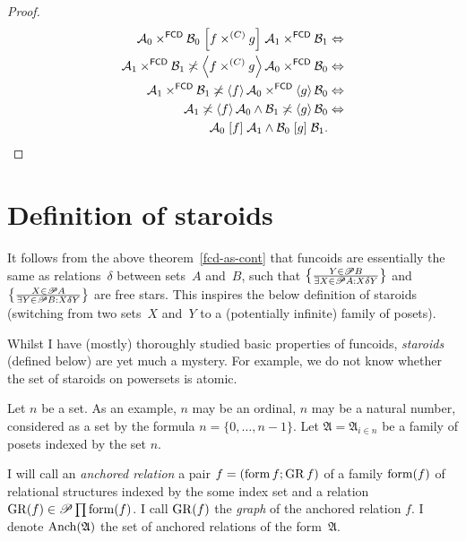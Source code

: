 \begin{proof}
~
\begin{align*}
\mathcal{A}_{0}\times^{\mathsf{FCD}}\mathcal{B}_{0}\mathrel{\left[f\times^{(C)}g\right]}\mathcal{A}_{1}\times^{\mathsf{FCD}}\mathcal{B}_{1} & \Leftrightarrow\\
\mathcal{A}_{1}\times^{\mathsf{FCD}}\mathcal{B}_{1}\not\asymp\left\langle f\times^{(C)}g\right\rangle\mathcal{A}_{0}\times^{\mathsf{FCD}}\mathcal{B}_{0} & \Leftrightarrow\\
\mathcal{A}_{1}\times^{\mathsf{FCD}}\mathcal{B}_{1}\not\asymp\left\langle f\right\rangle\mathcal{A}_{0}\times^{\mathsf{FCD}}\left\langle g\right\rangle\mathcal{B}_{0} & \Leftrightarrow\\
\mathcal{A}_{1}\not\asymp\left\langle f\right\rangle\mathcal{A}_{0}\land\mathcal{B}_{1}\not\asymp\left\langle g\right\rangle\mathcal{B}_{0} & \Leftrightarrow\\
\mathcal{A}_{0}\mathrel{\left[f\right]}\mathcal{A}_{1}\wedge\mathcal{B}_{0}\mathrel{\left[g\right]}\mathcal{B}_{1}.
\end{align*}

\end{proof}

\section{Definition of staroids}

It follows from the above theorem~\ref{fcd-as-cont} that funcoids
are essentially the same as relations~$\delta$ between sets~$A$
and~$B$, such that $\left\{ \frac{Y\in\mathscr{P} B}{\exists X\in\mathscr{P} A:X\mathrel{\delta}Y}\right\}$
and $\left\{ \frac{X\in\mathscr{P} A}{\exists Y\in\mathscr{P} B:X\mathrel{\delta}Y}\right\}$
are free stars. This inspires the below definition of staroids (switching
from two sets~$X$ and~$Y$ to a (potentially infinite) family of
posets).

Whilst I have (mostly) thoroughly studied basic properties of funcoids,
\emph{staroids} (defined below) are yet much a mystery. For example,
we do not know whether the set of staroids on powersets is atomic.

Let $n$ be a set. As an example, $n$ may be an ordinal, $n$ may
be a natural number, considered as a set by the formula $n=\{0,\ldots,n-1\}$.
Let $\mathfrak{A}=\mathfrak{A}_{i\in n}$ be a family of posets indexed
by the set $n$.
\begin{defn}
I will
call an \emph{anchored relation} a pair $f=(\operatorname{form} f;\operatorname{GR} f)$ of a
family $\operatorname{form}(f)$ of relational structures indexed by the some index
set and a relation $\operatorname{GR}(f)\in\mathscr{P}\prod\operatorname{form}(f)$. I call $\operatorname{GR}(f)$
the \emph{graph} of the anchored relation $f$. I denote $\operatorname{Anch}(\mathfrak{A})$
the set of anchored relations of the form~$\mathfrak{A}$.
\end{defn}

